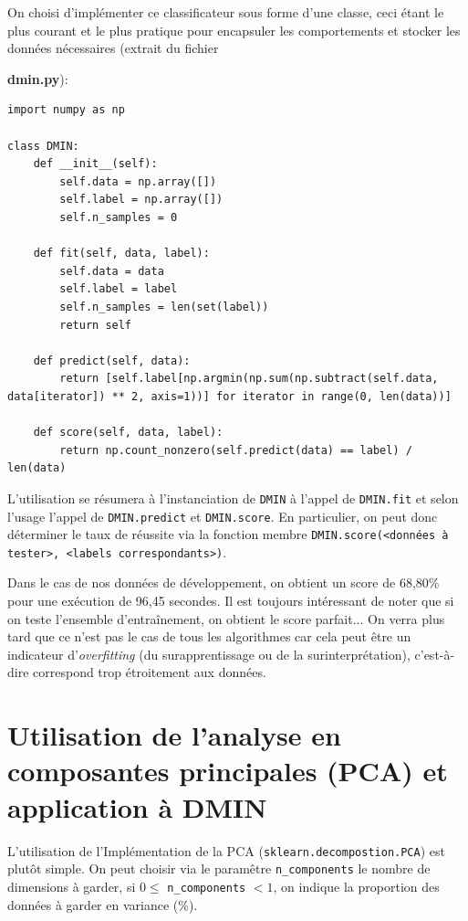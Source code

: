 \documentclass[12pt,a4paper]{article}
\begin{document}
On choisi d'implémenter ce classificateur sous forme d'une classe, ceci étant le plus courant et le plus pratique pour encapsuler les comportements et stocker les données nécessaires (extrait du fichier {\textbf{\ttfamily dmin.py}):
\begin{lstlisting}[style=darkula]
import numpy as np

class DMIN:
	def __init__(self):
		self.data = np.array([])
		self.label = np.array([])
		self.n_samples = 0

	def fit(self, data, label):
		self.data = data
		self.label = label
		self.n_samples = len(set(label))
		return self
		
	def predict(self, data):
		return [self.label[np.argmin(np.sum(np.subtract(self.data, data[iterator]) ** 2, axis=1))] for iterator in range(0, len(data))]

	def score(self, data, label):
		return np.count_nonzero(self.predict(data) == label) / len(data)
\end{lstlisting}

L'utilisation se résumera à l'instanciation de \lstinline[style=default]|DMIN| à l'appel de \lstinline[style=default]|DMIN.fit| et selon l'usage l'appel de \lstinline[style=default]|DMIN.predict| et \lstinline[style=default]|DMIN.score|.
En particulier, on peut donc déterminer le taux de réussite via la fonction membre \lstinline[style=default]|DMIN.score(<données à tester>, <labels correspondants>)|.

Dans le cas de nos données de développement, on obtient un score de 68,80\% pour une exécution de 96,45 secondes.
Il est toujours intéressant de noter que si on teste l'ensemble d'entraînement, on obtient le score parfait... On verra plus tard que ce n'est pas le cas de tous les algorithmes car cela peut être un indicateur d'\textit{overfitting} (du surapprentissage ou de la surinterprétation), c'est-à-dire correspond trop étroitement aux données.

\section{Utilisation de l'analyse en composantes principales (PCA) et application à DMIN}

L'utilisation de l'Implémentation de la PCA (\lstinline[style=default]|sklearn.decompostion.PCA|) est plutôt simple. 
On peut choisir via le paramêtre \lstinline[style=default]|n_components| le nombre de dimensions à garder, \linebreak[4] si $0 \leq$  \lstinline[style=default]|n_components| $< 1$, on indique la proportion des données à garder en variance (\%).

}
\end{document}
